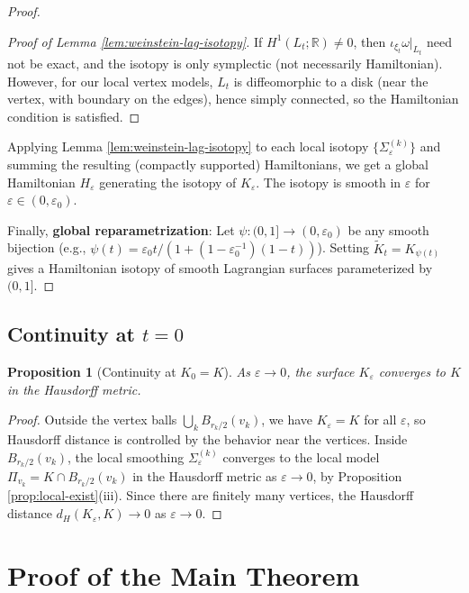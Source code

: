 \documentclass[12pt]{article}
\newtheorem{proposition}[theorem]{Proposition}
\newcommand{\bR}{\mathbb{R}}
\newcommand{\eps}{\varepsilon}
\newcommand{\om}{\omega}
\begin{document}
\begin{proof}
\begin{proof}[Proof of Lemma \ref{lem:weinstein-lag-isotopy}]
If $H^1(L_t;\bR) \neq 0$, then $\iota_{\xi_t}\om|_{L_t}$ need not be exact, and the isotopy is only symplectic (not necessarily Hamiltonian). However, for our local vertex models, $L_t$ is diffeomorphic to a disk (near the vertex, with boundary on the edges), hence simply connected, so the Hamiltonian condition is satisfied.
\end{proof}

Applying Lemma \ref{lem:weinstein-lag-isotopy} to each local isotopy $\{\Sigma_\eps^{(k)}\}$ and summing the resulting (compactly supported) Hamiltonians, we get a global Hamiltonian $H_\eps$ generating the isotopy of $K_\eps$. The isotopy is smooth in $\eps$ for $\eps \in (0, \eps_0)$.

Finally, \textbf{global reparametrization}: Let $\psi \colon (0,1] \to (0, \eps_0)$ be any smooth bijection (e.g., $\psi(t) = \eps_0 t/(1 + (1-\eps_0^{-1})(1-t))$). Setting $\tilde K_t = K_{\psi(t)}$ gives a Hamiltonian isotopy of smooth Lagrangian surfaces parameterized by $(0,1]$.
\end{proof}

\subsection{Continuity at $t = 0$}

\begin{proposition}[Continuity at $K_0 = K$]
\label{prop:continuity-at-zero}
As $\eps \to 0$, the surface $K_\eps$ converges to $K$ in the Hausdorff metric.
\end{proposition}

\begin{proof}
Outside the vertex balls $\bigcup_k B_{r_k/2}(v_k)$, we have $K_\eps = K$ for all $\eps$, so Hausdorff distance is controlled by the behavior near the vertices. Inside $B_{r_k/2}(v_k)$, the local smoothing $\Sigma_\eps^{(k)}$ converges to the local model $\Pi_{v_k} = K \cap B_{r_k/2}(v_k)$ in the Hausdorff metric as $\eps \to 0$, by Proposition \ref{prop:local-exist}(iii). Since there are finitely many vertices, the Hausdorff distance $d_H(K_\eps, K) \to 0$ as $\eps \to 0$.
\end{proof}

\section{Proof of the Main Theorem}
\label{sec:proof}
\end{document}
